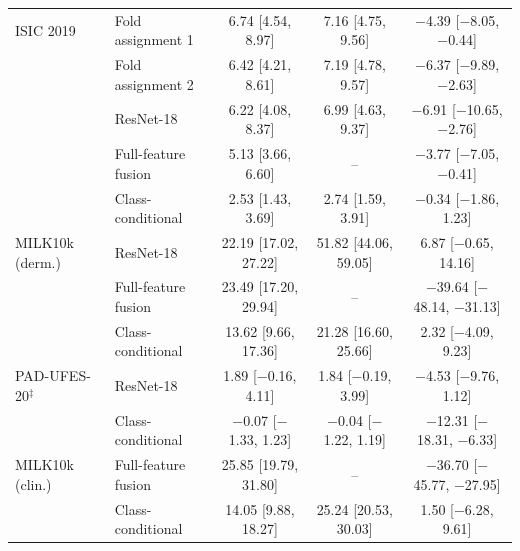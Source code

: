 \begin{table}[tp]
\begin{tabular}{llccc}
ISIC 2019 & Fold assignment 1 & 6.74 [4.54, 8.97] & 7.16 [4.75, 9.56] & \ensuremath{-}4.39 [\ensuremath{-}8.05, \ensuremath{-}0.44]\\
 & Fold assignment 2 & 6.42 [4.21, 8.61] & 7.19 [4.78, 9.57] & \ensuremath{-}6.37 [\ensuremath{-}9.89, \ensuremath{-}2.63]\\
 & ResNet-18 & 6.22 [4.08, 8.37] & 6.99 [4.63, 9.37] & \ensuremath{-}6.91 [\ensuremath{-}10.65, \ensuremath{-}2.76]\\
 & Full-feature fusion & 5.13 [3.66, 6.60] & -- & \ensuremath{-}3.77 [\ensuremath{-}7.05, \ensuremath{-}0.41]\\
 & Class-conditional & 2.53 [1.43, 3.69] & 2.74 [1.59, 3.91] & \ensuremath{-}0.34 [\ensuremath{-}1.86, 1.23]\\
MILK10k (derm.) & ResNet-18 & 22.19 [17.02, 27.22] & 51.82 [44.06, 59.05] & 6.87 [\ensuremath{-}0.65, 14.16]\\
 & Full-feature fusion & 23.49 [17.20, 29.94] & -- & \ensuremath{-}39.64 [\ensuremath{-}48.14, \ensuremath{-}31.13]\\
 & Class-conditional & 13.62 [9.66, 17.36] & 21.28 [16.60, 25.66] & 2.32 [\ensuremath{-}4.09, 9.23]\\
PAD-UFES-20$^\ddagger$ & ResNet-18 & 1.89 [\ensuremath{-}0.16, 4.11] & 1.84 [\ensuremath{-}0.19, 3.99] & \ensuremath{-}4.53 [\ensuremath{-}9.76, 1.12]\\
 & Class-conditional & \ensuremath{-}0.07 [\ensuremath{-}1.33, 1.23] & \ensuremath{-}0.04 [\ensuremath{-}1.22, 1.19] & \ensuremath{-}12.31 [\ensuremath{-}18.31, \ensuremath{-}6.33]\\
MILK10k (clin.) & Full-feature fusion & 25.85 [19.79, 31.80] & -- & \ensuremath{-}36.70 [\ensuremath{-}45.77, \ensuremath{-}27.95]\\
 & Class-conditional & 14.05 [9.88, 18.27] & 25.24 [20.53, 30.03] & 1.50 [\ensuremath{-}6.28, 9.61]\\
\bottomrule\end{tabular}\end{table}
